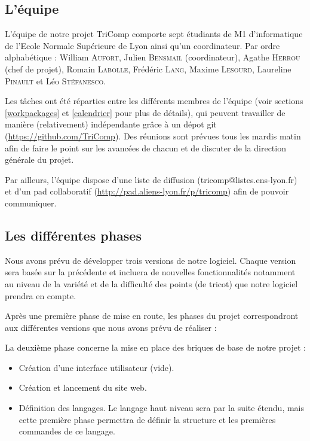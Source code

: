 \documentclass{article}
\begin{document}
\subsection{L'équipe}

L'équipe de notre projet TriComp comporte sept étudiants de M1 d'informatique de l'Ecole Normale Supérieure de Lyon ainsi qu'un coordinateur. Par ordre alphabétique : William \textsc{Aufort}, 
Julien \textsc{Bensmail} (coordinateur), Agathe \textsc{Herrou} (chef de projet), Romain \textsc{Labolle}, Frédéric \textsc{Lang}, Maxime 
\textsc{Lesourd}, Laureline \textsc{Pinault} et Léo \textsc{Stéfanesco}. \newline

Les tâches ont été réparties entre les différents membres de l'équipe (voir sections \ref{workpackages} et \ref{calendrier} pour plus de détails), qui peuvent travailler de manière (relativement) indépendante grâce à un dépot git (\url{https://github.com/TriComp}). Des réunions sont prévues tous les mardis matin afin de faire le point sur les avancées de chacun et de discuter de la direction générale du projet.

Par ailleurs, l'équipe dispose d'une liste de diffusion (tricomp@listes.ens-lyon.fr) et d'un pad collaboratif (\url{http://pad.aliens-lyon.fr/p/tricomp}) afin de pouvoir communiquer.

\subsection{Les différentes phases}

Nous avons prévu de développer trois versions de notre logiciel. Chaque version sera basée sur la précédente et incluera de nouvelles 
fonctionnalités notamment au niveau de la variété et de la difficulté des points (de tricot) que notre logiciel prendra en compte. \newline

Après une première phase de mise en route, les phases du projet correspondront aux différentes versions que nous avons prévu de réaliser :

La deuxième phase concerne la mise en place des briques de base de notre projet :
    \begin{itemize}
     \item Création d'une interface utilisateur (vide).
     \item Création et lancement du site web.
     \item Définition des langages. Le langage haut niveau sera par la suite étendu, mais cette première phase permettra de définir la 
structure et les premières commandes de ce langage.
    \end{itemize}
\end{document}
